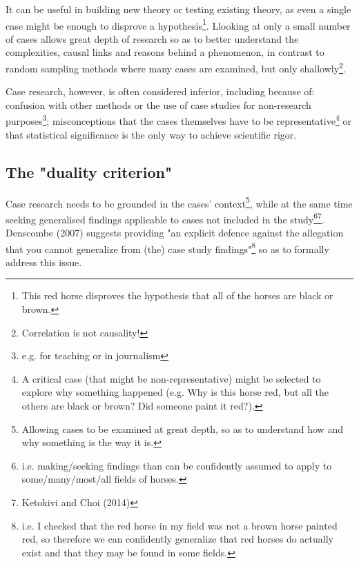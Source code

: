 \documentclass{tufte-handout}
\begin{document}
It can be useful in building new theory 
or testing existing theory, 
as even a single case might be enough to disprove 
a hypothesis\footnote{
This red horse disproves the hypothesis that all of the horses are black or brown.}.
Llooking at only a small number of cases 
allows great depth of research so as to better understand 
the complexities, causal links and reasons behind a phenomenon, 
in contrast to random sampling methods where many cases are examined, but only shallowly\cite{Denscombe2007aa}\footnote{Correlation is not causality!}.

Case research, however, is often considered inferior, including because of: confusion with other methods or the use of case studies for non-research purposes\footnote{e.g. for teaching or in journalism}; misconceptions that the cases themselves have to be representative\footnote{A critical case (that might be non-representative) might be selected to explore why something happened (e.g. Why is this horse red, but all the others are black or brown? Did someone paint it red?).} or that statistical significance is the only way to achieve scientific rigor\cite{Bonoma1984aa,}.


\subsection{The "duality criterion"}
Case research needs to be grounded in the cases' context\footnote{Allowing cases to be examined at great depth, so as to understand how and why something is the way it is.}, while at the same time seeking generalised findings applicable to cases not included in the study\footnote{i.e. making/seeking findings than can be confidently assumed to apply to some/many/most/all fields of horses.}\footnote{Ketokivi and Choi (2014)}. Denscombe (2007) suggests providing "an explicit defence against the allegation that you cannot generalize from (the) case study findings"\footnote{i.e. I checked that the red horse in my field was not a brown horse painted red, so therefore we can confidently generalize that red horses do actually exist and that they may be found in some fields.} so as to formally address this issue.
\end{document}
